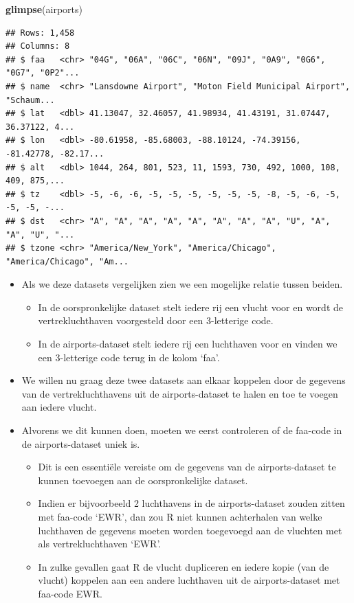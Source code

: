 \documentclass[]{tufte-book}
\newenvironment{Shaded}{}{}
\newcommand{\KeywordTok}[1]{\textcolor[rgb]{0.00,0.44,0.13}{\textbf{#1}}}
\newcommand{\NormalTok}[1]{#1}
\providecommand{\tightlist}{%
  \setlength{\itemsep}{0pt}\setlength{\parskip}{0pt}}
\begin{document}
\begin{Shaded}
\begin{Highlighting}[]
\KeywordTok{glimpse}\NormalTok{(airports)}
\end{Highlighting}
\end{Shaded}

\begin{verbatim}
## Rows: 1,458
## Columns: 8
## $ faa   <chr> "04G", "06A", "06C", "06N", "09J", "0A9", "0G6", "0G7", "0P2"...
## $ name  <chr> "Lansdowne Airport", "Moton Field Municipal Airport", "Schaum...
## $ lat   <dbl> 41.13047, 32.46057, 41.98934, 41.43191, 31.07447, 36.37122, 4...
## $ lon   <dbl> -80.61958, -85.68003, -88.10124, -74.39156, -81.42778, -82.17...
## $ alt   <dbl> 1044, 264, 801, 523, 11, 1593, 730, 492, 1000, 108, 409, 875,...
## $ tz    <dbl> -5, -6, -6, -5, -5, -5, -5, -5, -5, -8, -5, -6, -5, -5, -5, -...
## $ dst   <chr> "A", "A", "A", "A", "A", "A", "A", "A", "U", "A", "A", "U", "...
## $ tzone <chr> "America/New_York", "America/Chicago", "America/Chicago", "Am...
\end{verbatim}

\begin{itemize}
\tightlist
\item
  Als we deze datasets vergelijken zien we een mogelijke relatie tussen beiden.

  \begin{itemize}
  \tightlist
  \item
    In de oorspronkelijke dataset stelt iedere rij een vlucht voor en wordt de vertrekluchthaven voorgesteld door een 3-letterige code.
  \item
    In de airports-dataset stelt iedere rij een luchthaven voor en vinden we een 3-letterige code terug in de kolom `faa'.
  \end{itemize}
\item
  We willen nu graag deze twee datasets aan elkaar koppelen door de gegevens van de vertrekluchthavens uit de airports-dataset te halen en toe te voegen aan iedere vlucht.
\item
  Alvorens we dit kunnen doen, moeten we eerst controleren of de faa-code in de airports-dataset uniek is.

  \begin{itemize}
  \tightlist
  \item
    Dit is een essentiële vereiste om de gegevens van de airports-dataset te kunnen toevoegen aan de oorspronkelijke dataset.
  \item
    Indien er bijvoorbeeld 2 luchthavens in de airports-dataset zouden zitten met faa-code `EWR', dan zou R niet kunnen achterhalen van welke luchthaven de gegevens moeten worden toegevoegd aan de vluchten met als vertrekluchthaven `EWR'.
  \item
    In zulke gevallen gaat R de vlucht dupliceren en iedere kopie (van de vlucht) koppelen aan een andere luchthaven uit de airports-dataset met faa-code EWR.
  \end{itemize}
\end{itemize}
\end{document}
